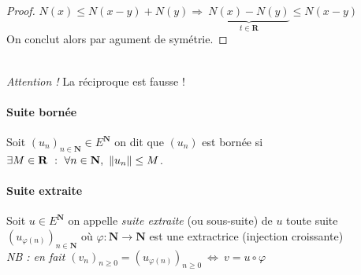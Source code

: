 		 \medskip


		\begin{proof}
			$N(x)\leq N(x-y) + N(y) \Rightarrow ~ \underbrace{N(x) - N(y)}_{t\in \mathbf{R}} \leq N(x-y)$\\
			On conclut alors par agument de symétrie.
		\end{proof} \medskip

			
		 \\
		{\small \emph{Attention !} La réciproque est fausse !}

		\vspace{-15pt}
		\traitd
		\paragraph{Suite bornée}
			Soit $\left(u_n\right)_{n\in\mathbf{N}} \in E^{\mathbf{N}}$ on dit que $\left(u_n\right)$ est bornée si
			$\exists M \in \mathbf{R} ~:~ \forall n\in\mathbf{N} ,~\left\Vert u_n \right\Vert\leq M$. 
		\trait

		 \medskip

		
		\traitd
		\paragraph{Suite extraite}
			Soit $u \in E^{\mathbf{N}}$ on appelle \emph{suite extraite} (ou sous-suite) de $u$ toute suite
			$\left(u_{\varphi (n)}\right)_{n\in \mathbf{N}}$ où $\varphi : \mathbf{N} \rightarrow \mathbf{N}$ 
			est une extractrice (injection croissante) \\ \textit{\small NB : en fait $\left(v_n\right)_{n\geq0} = 
			\left(u_{\varphi (n)} \right)_{n\geq 0} ~\Leftrightarrow ~v= u\circ\varphi$} 
		\traitdouble
